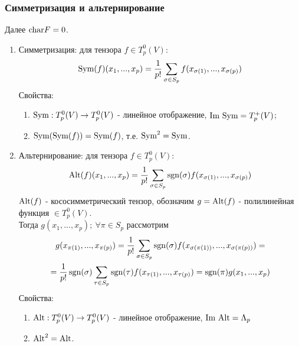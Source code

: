 \subsubsection*{Симметризация и альтернирование}
Далее $\textup{char} F = 0$.
\begin{enumerate}
    \item Симметризация: для тензора $f \in T_p^0(V)$:
    \[\textup{Sym}(f)(x_1,...,x_p) = \frac{1}{p!}\sum \limits_{\sigma \in S_p}f(x_{\sigma(1)},...,x_{\sigma(p)})\]
    Свойства:
    \begin{enumerate}
        \item $\textup{Sym}: T_p^0(V) \rightarrow T_p^0(V)$ - линейное отображение, $\textup{Im }\textup{Sym} = T_p^+(V)$;
        \item $\textup{Sym}(\textup{Sym}(f)) = \textup{Sym}(f)$, т.е. $\textup{Sym}^2 = \textup{Sym}$.
    \end{enumerate}
    \item Альтернирование: для тензора $f \in T_p^0(V)$:
    \[\textup{Alt}(f)(x_1,...,x_p) = \frac{1}{p!}\sum \limits_{\sigma \in S_p} \operatorname{sgn}(\sigma)f(x_{\sigma(1)},...,x_{\sigma(p)})\]
    $\textup{Alt}(f)$ - кососимметрический тензор, обозначим $g = \textup{Alt}(f)$ - полилинейная функция $\in T_p^0(V)$.\\
    Тогда $g(x_1,...,x_p);\ \forall \pi \in S_p$ рассмотрим
    \begin{multline*}
        g(x_{\pi(1)},...,x_{\pi(p)}) = \frac{1}{p!}\sum \limits_{\sigma \in S_p} \operatorname{sgn}(\sigma)f(x_{\sigma(\pi(1))},...,x_{\sigma(\pi(p))}) =\\= \frac{1}{p!}\operatorname{sgn}(\sigma)\sum \limits_{\tau \in S_p} \operatorname{sgn}(\tau)f(x_{\tau(1)},...,x_{\tau(p)}) = \operatorname{sgn}(\pi)g(x_1,...,x_p)
    \end{multline*}
     Свойства:
    \begin{enumerate}
        \item $\textup{Alt}: T_p^0(V) \rightarrow T_p^0(V)$ - линейное отображение, $\textup{Im }\textup{Alt} = \Lambda_p$
        \item $\textup{Alt}^2 = \textup{Alt}$.
    \end{enumerate}
\end{enumerate}
